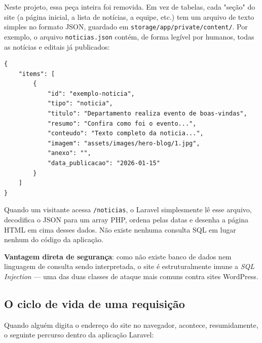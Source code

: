 \documentclass[11pt,a4paper]{article}
\begin{document}
Neste projeto, essa peça inteira foi removida. Em vez de tabelas, cada "seção" do site (a
página inicial, a lista de notícias, a equipe, etc.) tem um arquivo de texto simples no formato
JSON, guardado em \texttt{storage/app/private/content/}. Por exemplo, o arquivo
\texttt{noticias.json} contém, de forma legível por humanos, todas as notícias e editais já
publicados:

\begin{lstlisting}[caption={Exemplo real de storage/content/noticias.json}]
{
    "items": [
        {
            "id": "exemplo-noticia",
            "tipo": "noticia",
            "titulo": "Departamento realiza evento de boas-vindas",
            "resumo": "Confira como foi o evento...",
            "conteudo": "Texto completo da noticia...",
            "imagem": "assets/images/hero-blog/1.jpg",
            "anexo": "",
            "data_publicacao": "2026-01-15"
        }
    ]
}
\end{lstlisting}

Quando um visitante acessa \texttt{/noticias}, o Laravel simplesmente lê esse arquivo, decodifica
o JSON para um array PHP, ordena pelas datas e desenha a página HTML em cima desses dados. Não
existe nenhuma consulta SQL em lugar nenhum do código da aplicação.

\textbf{Vantagem direta de segurança}: como não existe banco de dados nem linguagem de consulta
sendo interpretada, o site é estruturalmente imune a \emph{SQL Injection} — uma das duas classes
de ataque mais comuns contra sites WordPress.

\subsection{O ciclo de vida de uma requisição}

Quando alguém digita o endereço do site no navegador, acontece, resumidamente, o seguinte
percurso dentro da aplicação Laravel:
\end{document}
